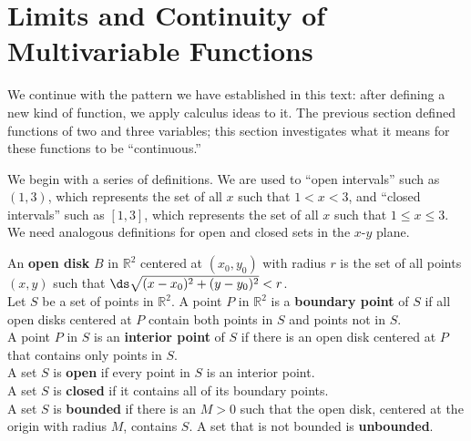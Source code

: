 \section{Limits and Continuity of Multivariable Functions}\label{sec:multi_limit}

We continue with the pattern we have established in this text: after defining a new kind of function, we apply calculus ideas to it. The previous section defined functions of two and three variables; this section investigates what it means for these functions to be ``continuous.''

We begin with a series of definitions. We are used to ``open intervals'' such as $(1,3)$, which represents the set of all $x$ such that $1<x<3$,  and ``closed intervals'' such as $[1,3]$, which represents the set of all $x$ such that $1\leq x\leq 3$. We need analogous definitions for open and closed sets in the $x$-$y$ plane.


{An \textbf{open disk} $B$ in $\mathbb{R}^2$ centered at $(x_0,y_0)$ with radius $r$ is the set of all points $(x,y)$ such that $\ds\sqrt{(x-x_0)^2+(y-y_0)^2} < r$. \\

Let $S$ be a set of points in $\mathbb{R}^2$. A point $P$ in $\mathbb{R}^2$ is a \textbf{boundary point} of $S$  if all open disks centered at $P$ contain both points in $S$ and points not in $S$.\\

A point $P$ in $S$ is an \textbf{interior point} of $S$ if there is an open disk centered at $P$ that contains only points in $S$. \\

A set $S$ is \textbf{open} if every point in $S$ is an interior point.\\

A set $S$ is \textbf{closed} if it contains all of its boundary points.\\

A set $S$ is \textbf{bounded} if there is an $M>0$ such that the open disk, centered at the origin with radius $M$, contains $S$. A set that is not bounded is \textbf{unbounded}.
}

